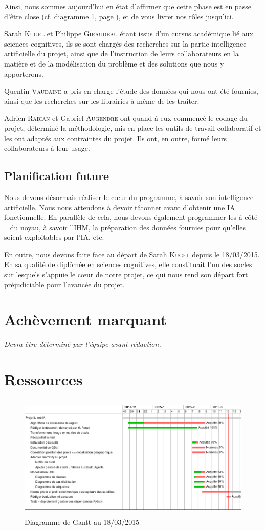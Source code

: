 \documentclass[a4paper, 12pt]{article}
\begin{document}
Ainsi, nous sommes aujourd'hui en état d'affirmer que cette phase est en passe d'être close (cf. diagramme \ref{gantt}, page \pageref{gantt}), et de vous livrer nos rôles jusqu'ici.

Sarah \textsc{Kugel} et Philippe \textsc{Giraudeau} étant issus d'un cursus académique lié aux sciences cognitives, ils se sont chargés des recherches sur la partie intelligence artificielle du projet, ainsi que de l'instruction de leurs collaborateurs en la matière et de la modélisation du problème et des solutions que nous y apporterons.

Quentin \textsc{Vaudaine} a pris en charge l'étude des données qui nous ont été fournies, ainsi que les recherches sur les librairies à même de les traiter.

Adrien \textsc{Rabian} et Gabriel \textsc{Augendre} ont quand à eux commencé le codage du projet, déterminé la méthodologie, mis en place les outils de travail collaboratif et les ont adaptés aux contraintes du projet. Ils ont, en outre, formé leurs collaborateurs à leur usage.

\subsection{Planification future}
Nous devons désormais réaliser le cœur du programme, à savoir son intelligence artificielle. Nous nous attendons à devoir tâtonner avant d'obtenir une IA fonctionnelle. En parallèle de cela, nous devons également programmer les \og à côté \fg ~ du noyau, à savoir l'IHM, la préparation des données fournies pour qu'elles soient exploitables par l'IA, etc.

En outre, nous devons faire face au départ de Sarah \textsc{Kugel} depuis le 18/03/2015. En sa qualité de diplômée en sciences cognitives, elle constituait l'un des socles sur lesquels s'appuie le cœur de notre projet, ce qui nous rend son départ fort préjudiciable pour l'avancée du projet.

\section{Achèvement marquant}
\textsl{Devra être déterminé par l'équipe avant rédaction.}

\newpage
\appendix
\section{Ressources}
	\begin{figure}
		\begin{center}
			\includegraphics[height=60mm]{gantt.png}
			\newline
			\caption{Diagramme de Gantt au 18/03/2015}
			\label{gantt}
		\end{center}
	\end{figure}
\end{document}
